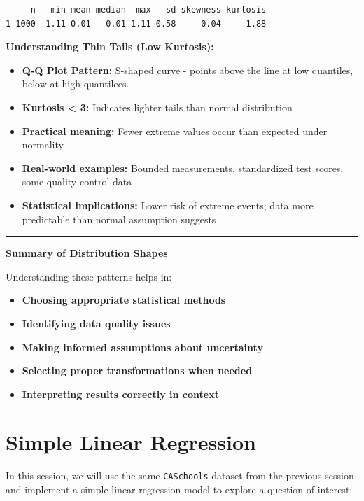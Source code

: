\documentclass[
  12pt,
  letterpaper,
]{scrbook}
\providecommand{\tightlist}{%
  \setlength{\itemsep}{0pt}\setlength{\parskip}{0pt}}
\renewcommand{\tightlist}{\setlength{\itemsep}{0.5\baselineskip}\setlength{\parskip}{0.2\baselineskip}}
\theoremstyle{definition}
\theoremstyle{plain}
\theoremstyle{remark}
\begin{document}
\begin{verbatim}
     n   min mean median  max   sd skewness kurtosis
1 1000 -1.11 0.01   0.01 1.11 0.58    -0.04     1.88
\end{verbatim}

\textbf{Understanding Thin Tails (Low Kurtosis):}

\begin{itemize}
\tightlist
\item
  \textbf{Q-Q Plot Pattern:} S-shaped curve - points above the line at
  low quantiles, below at high quantilees.
\item
  \textbf{Kurtosis \textless{} 3:} Indicates lighter tails than normal
  distribution
\item
  \textbf{Practical meaning:} Fewer extreme values occur than expected
  under normality
\item
  \textbf{Real-world examples:} Bounded measurements, standardized test
  scores, some quality control data
\item
  \textbf{Statistical implications:} Lower risk of extreme events; data
  more predictable than normal assumption suggests
\end{itemize}

\begin{center}\rule{0.5\linewidth}{0.5pt}\end{center}

\textbf{Summary of Distribution Shapes}

Understanding these patterns helps in:

\begin{itemize}
\tightlist
\item
  \textbf{Choosing appropriate statistical methods}
\item
  \textbf{Identifying data quality issues}
\item
  \textbf{Making informed assumptions about uncertainty}
\item
  \textbf{Selecting proper transformations when needed}
\item
  \textbf{Interpreting results correctly in context}
\end{itemize}

\chapter{Simple Linear Regression}\label{simple-linear-regression}

In this session, we will use the same \texttt{CASchools} dataset from
the previous session and implement a simple linear regression model to
explore a question of interest:
\end{document}
